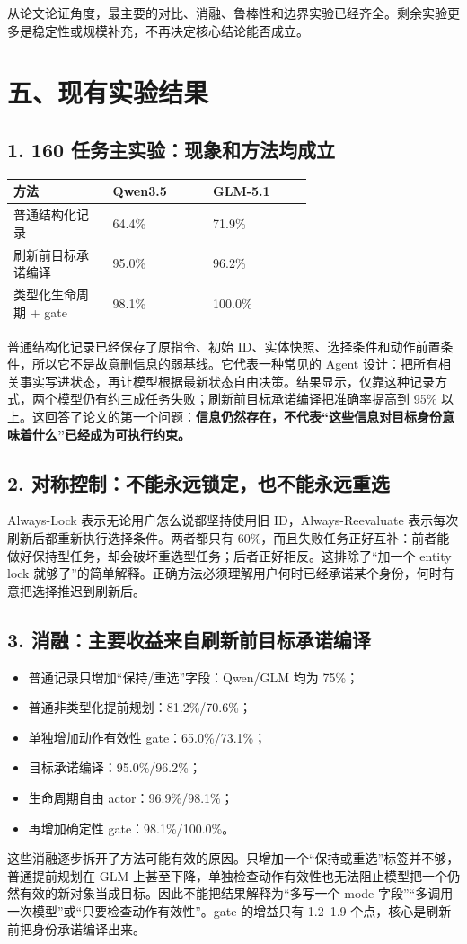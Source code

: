 \documentclass[10pt,fontset=none]{ctexart}
\begin{document}
\par 从论文论证角度，最主要的对比、消融、鲁棒性和边界实验已经齐全。剩余实验更多是稳定性或规模补充，不再决定核心结论能否成立。
\section{五、现有实验结果}
\subsection{1. 160 任务主实验：现象和方法均成立}
\begin{longtable}{@{}p{0.220\linewidth} p{0.220\linewidth} p{0.220\linewidth}@{}}
\toprule
方法 & Qwen3.5 & GLM-5.1 \\
\midrule\endhead
普通结构化记录 & 64.4\% & 71.9\% \\
刷新前目标承诺编译 & 95.0\% & 96.2\% \\
类型化生命周期 + gate & 98.1\% & 100.0\% \\
\bottomrule
\end{longtable}

\par 普通结构化记录已经保存了原指令、初始 ID、实体快照、选择条件和动作前置条件，所以它不是故意删信息的弱基线。它代表一种常见的 Agent 设计：把所有相关事实写进状态，再让模型根据最新状态自由决策。结果显示，仅靠这种记录方式，两个模型仍有约三成任务失败；刷新前目标承诺编译把准确率提高到 95\% 以上。这回答了论文的第一个问题：\textbf{信息仍然存在，不代表“这些信息对目标身份意味着什么”已经成为可执行约束。}
\subsection{2. 对称控制：不能永远锁定，也不能永远重选}
\par Always-Lock 表示无论用户怎么说都坚持使用旧 ID，Always-Reevaluate 表示每次刷新后都重新执行选择条件。两者都只有 60\%，而且失败任务正好互补：前者能做好保持型任务，却会破坏重选型任务；后者正好相反。这排除了“加一个 entity lock 就够了”的简单解释。正确方法必须理解用户何时已经承诺某个身份，何时有意把选择推迟到刷新后。
\subsection{3. 消融：主要收益来自刷新前目标承诺编译}
\begin{itemize}
\item 普通记录只增加“保持/重选”字段：Qwen/GLM 均为 75\%；
\item 普通非类型化提前规划：81.2\%/70.6\%；
\item 单独增加动作有效性 gate：65.0\%/73.1\%；
\item 目标承诺编译：95.0\%/96.2\%；
\item 生命周期自由 actor：96.9\%/98.1\%；
\item 再增加确定性 gate：98.1\%/100.0\%。
\end{itemize}
\par 这些消融逐步拆开了方法可能有效的原因。只增加一个“保持或重选”标签并不够，普通提前规划在 GLM 上甚至下降，单独检查动作有效性也无法阻止模型把一个仍然有效的新对象当成目标。因此不能把结果解释为“多写一个 mode 字段”“多调用一次模型”或“只要检查动作有效性”。gate 的增益只有 1.2--1.9 个点，核心是刷新前把身份承诺编译出来。
\end{document}

